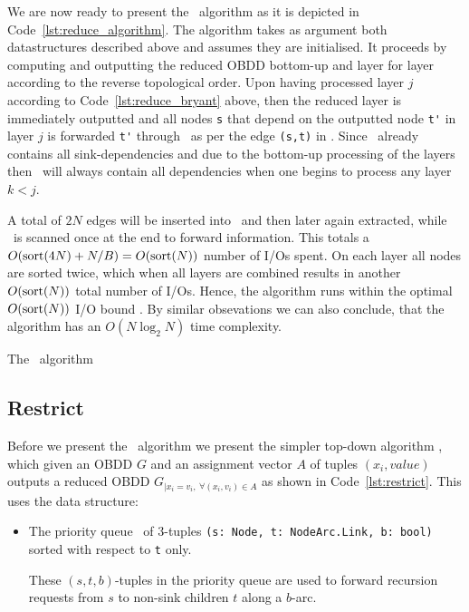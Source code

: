 We are now ready to present the \Reduce\ algorithm as it is depicted in
Code~\ref{lst:reduce_algorithm}. The algorithm takes as argument both
datastructures described above and assumes they are initialised. It proceeds by
computing and outputting the reduced OBDD bottom-up and layer for layer
according to the reverse topological order. Upon having processed layer $j$
according to Code~\ref{lst:reduce_bryant} above, then the reduced layer is
immediately outputted and all nodes \lstinline{s} that depend on the outputted
node \lstinline{t'} in layer $j$ is forwarded \lstinline{t'} through
\ReduceQdep\ as per the edge \lstinline{(s,t)} in \ReduceLforward. Since
\ReduceQdep\ already contains all sink-dependencies and due to the bottom-up
processing of the layers then \ReduceQdep\ will always contain all dependencies
when one begins to process any layer $k < j$.

A total of $2 N$ edges will be inserted into \ReduceQdep\ and then later again
extracted, while \ReduceLforward\ is scanned once at the end to forward
information. This totals a $O(\text{sort}(4N) + N/B) = O(\text{sort}(N))$ number of I/Os
spent. On each layer all nodes are sorted twice, which when all layers are
combined results in another $O(\text{sort}(N))$ total number of I/Os. Hence, the
algorithm runs within the optimal $O(\text{sort}(N))$ I/O bound \cite{Arge96}. By
similar obsevations we can also conclude, that the algorithm has an $O(N \log_2
N)$ time complexity.

\begin{lstfloat}
  \centering

  

  \caption{The \Reduce\ algorithm}
  \label{lst:reduce_algorithm}
\end{lstfloat}

\clearpage
\subsection{Restrict} \label{sec:theory__restrict}
Before we present the \Apply\ algorithm we present the simpler top-down
algorithm \Restrict, which given an OBDD $G$ and an assignment vector $A$ of
tuples $(x_i, \mathit{value})$ outputs a reduced OBDD $G_{| x_i = v_i ,\ \forall
  (x_i,v_i) \in A}$ as shown in Code~\ref{lst:restrict}.  This uses the data
structure:

\begin{itemize}
\item The priority queue \RestrictQrec\ of 3-tuples
    \lstinline{(s: Node, t: NodeArc.Link, b: bool)} sorted with respect to
    \lstinline{t} only.

  These $(s,t,b)$-tuples in the priority queue are used to forward recursion
  requests from $s$ to non-sink children $t$ along a $b$-arc.
\end{itemize}

